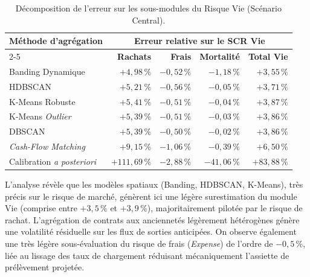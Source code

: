 \begin{table}[H]
    \centering
    \renewcommand{\arraystretch}{1.4}
    \begin{tabular}{|l|r|r|r|r|}
        \hline
        \multirow{2}{*}{\textbf{Méthode d'agrégation}} & \multicolumn{4}{c|}{\textbf{Erreur relative sur le SCR Vie}} \\
        \cline{2-5}
        & \textbf{Rachats} & \textbf{Frais} & \textbf{Mortalité} & \textbf{Total Vie} \\
        \hline
        Banding Dynamique & \textbf{$+4{,}98\,\%$} & \textbf{$-0{,}52\,\%$} & \textbf{$-1{,}18\,\%$} & \textbf{$+3{,}55\,\%$} \\
        HDBSCAN & $+5{,}21\,\%$ & $-0{,}56\,\%$ & $-0{,}05\,\%$ & $+3{,}71\,\%$ \\
        K-Means Robuste & $+5{,}41\,\%$ & $-0{,}51\,\%$ & $-0{,}04\,\%$ & $+3{,}87\,\%$ \\
        K-Means \textit{Outlier} & $+5{,}39\,\%$ & $-0{,}51\,\%$ & $-0{,}03\,\%$ & $+3{,}86\,\%$ \\
        DBSCAN & $+5{,}39\,\%$ & $-0{,}50\,\%$ & $-0{,}02\,\%$ & $+3{,}86\,\%$ \\
        \textit{Cash-Flow Matching} & $+9{,}15\,\%$ & $-1{,}06\,\%$ & $-0{,}39\,\%$ & $+6{,}50\,\%$ \\
        Calibration \textit{a posteriori} & $+111{,}69\,\%$ & $-2{,}88\,\%$ & $-41{,}06\,\%$ & $+83{,}88\,\%$ \\
        \hline
    \end{tabular}
    \caption{Décomposition de l'erreur sur les sous-modules du Risque Vie (Scénario Central).}
    \label{tab:resultats_central_vie}
\end{table}

L'analyse révèle que les modèles spatiaux (Banding, HDBSCAN, K-Means), très précis sur le risque de marché, génèrent ici une légère surestimation du module Vie (comprise entre $+3{,}5\,\%$ et $+3{,}9\,\%$), majoritairement pilotée par le risque de rachat. L'agrégation de contrats aux anciennetés légèrement hétérogènes génère une volatilité résiduelle sur les flux de sorties anticipées. On observe également une très légère sous-évaluation du risque de frais (\textit{Expense}) de l'ordre de $-0{,}5\,\%$, liée au lissage des taux de chargement réduisant mécaniquement l'assiette de prélèvement projetée.

